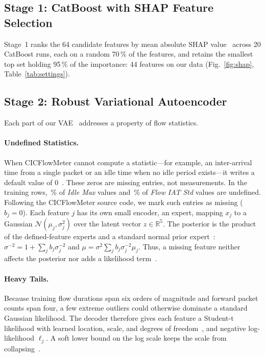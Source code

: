 \documentclass[runningheads,a4paper]{llncs}
\begin{document}
\subsection{Stage 1: CatBoost with SHAP Feature Selection}

Stage~1 ranks the 64 candidate features by mean absolute SHAP value~\cite{lundberg2017} across 20 CatBoost runs, each on a random 70\,\% of the features, and retains the smallest top set holding 95\,\% of the importance: 44 features on our data (Fig.~\ref{fig:shap}, Table~\ref{tab:settings}).

\subsection{Stage 2: Robust Variational Autoencoder}

Each part of our VAE~\cite{kingma2014} addresses a property of flow statistics.

\paragraph{Undefined Statistics.}
When CICFlowMeter cannot compute a statistic---for example, an inter-arrival time from a single packet or an idle time when no idle period exists---it writes a default value of 0~\cite{cicflowmeter}. These zeros are missing entries, not measurements. In the training rows, \UndefinedIdleMax\,\% of \emph{Idle Max} values and \UndefinedFlowIatStd\,\% of \emph{Flow IAT Std} values are undefined. Following the CICFlowMeter source code, we mark such entries as missing ($b_j=0$). Each feature $j$ has its own small encoder, an expert, mapping $x_j$ to a Gaussian $\mathcal{N}(\mu_j,\sigma_j^2)$ over the latent vector $z\in\mathbb{R}^5$. The posterior is the product of the defined-feature experts and a standard normal prior expert~\cite{wu2018}: $\sigma^{-2}=1+\sum_j b_j\sigma_j^{-2}$ and $\mu=\sigma^{2}\sum_j b_j\sigma_j^{-2}\mu_j$. Thus, a missing feature neither affects the posterior nor adds a likelihood term~\cite{ma2019eddi,ivanov2019}.

\paragraph{Heavy Tails.}
Because training flow durations span six orders of magnitude and forward packet counts span four, a few extreme outliers could otherwise dominate a standard Gaussian likelihood. The decoder therefore gives each feature a Student-t likelihood with learned location, scale, and degrees of freedom~\cite{takahashi2018}, and negative log-likelihood $\ell_j$. A soft lower bound on the log scale keeps the scale from collapsing~\cite{rybkin2021}.
\end{document}

